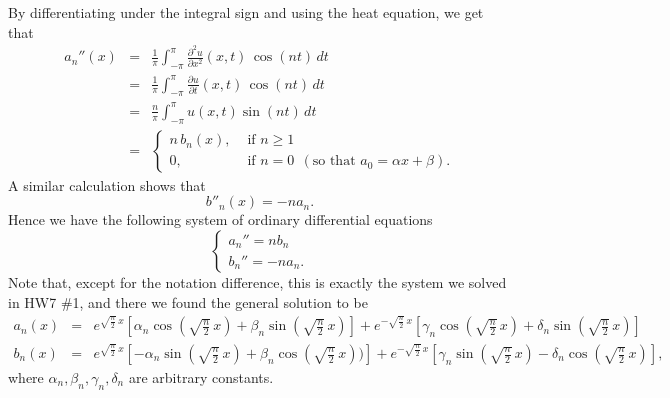 \documentclass[11pt]{article}
\theoremstyle{definition}
\begin{document}
\begin{enumerate}[leftmargin=*]
By differentiating under the integral sign and using the heat equation, we get that 
\begin{eqnarray*}
	a_{n}''(x)
	&=& \frac{1}{\pi}\int_{-\pi}^{\pi}\frac{\partial^{2}u}{\partial x^{2}}(x,t)\,\cos(nt)\,dt\\
	&=& \frac{1}{\pi}\int_{-\pi}^{\pi}\frac{\partial u}{\partial t}(x,t)\,\cos(nt)\,dt\\
	&=& \frac{n}{\pi}\int_{-\pi}^{\pi}u(x,t)\sin(nt)\,dt\\
	&=& \begin{cases}
	n\,b_{n}(x), & \text{ if } n\geq 1\\
	0, &\text { if } n=0 \ \  (\text{so that } a_0=\alpha x+\beta).
	\end{cases}
\end{eqnarray*}
A similar calculation shows that 
\[
b''_n(x)=-na_n.
\]
Hence we have the following system of ordinary differential equations
\[
\begin{cases}
a_n''=nb_n\\
b_n''=-na_n.
\end{cases}
\]
Note that, except for the notation difference, this is exactly the system we solved in HW7 \#1, and there we found the general solution to be 
\begin{eqnarray*}
	a_{n}(x)&=& e^{\sqrt{\frac{n}{2}}\,x}\left[\alpha_{n}\cos(\sqrt{\tfrac{n}{2}}\,x)+\beta_{n}\sin(\sqrt{\tfrac{n}{2}}\,x)\right]
	+e^{-\sqrt{\frac{n}{2}}\,x}\left[\gamma_{n}\cos(\sqrt{\tfrac{n}{2}}\,x)+\delta_{n}\sin(\sqrt{\tfrac{n}{2}}\,x)\right]\\
	b_{n}(x)&=&e^{\sqrt{\frac{n}{2}}\,x}\left[-\alpha_{n}\sin(\sqrt{\tfrac{n}{2}}\,x)+\beta_{n}\cos(\sqrt{\tfrac{n}{2}}\,x))\right]
	+e^{-\sqrt{\frac{n}{2}}\,x}\left[\gamma_{n}\sin(\sqrt{\tfrac{n}{2}}\,x)-\delta_{n}\cos(\sqrt{\tfrac{n}{2}}\,x)\right],
\end{eqnarray*}
where $\alpha_n, \beta_n, \gamma_n, \delta_n$ are arbitrary constants.\\


\end{enumerate}
\end{document}
